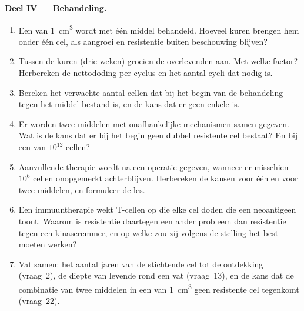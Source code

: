 \begin{problem}
\medskip
\noindent\textbf{Deel IV --- Behandeling.}
\begin{enumerate}[resume]
  \item Een  van \qty{1}{cm^3} wordt met één middel behandeld.
        Hoeveel kuren brengen hem onder één cel, als aangroei en
        resistentie buiten beschouwing blijven?
  \item Tussen de kuren (drie weken) groeien de overlevenden aan. Met
        welke factor? Herbereken de nettododing per cyclus en het
        aantal cycli dat nodig is.
  \item Bereken het verwachte aantal cellen dat bij het begin van de
        behandeling tegen het middel bestand is, en de kans dat er geen
        enkele is.
  \item Er worden twee middelen met onafhankelijke mechanismen samen
        gegeven. Wat is de kans dat er bij het begin geen dubbel
        resistente cel bestaat? En bij een  van $10^{12}$ cellen?
  \item Aanvullende therapie wordt na een operatie gegeven, wanneer er
        misschien $10^{6}$ cellen onopgemerkt achterblijven. Herbereken
        de kansen voor één en voor twee middelen, en formuleer de les.
  \item Een immuuntherapie wekt T-cellen op die elke cel doden die een
        neoantigeen toont. Waarom is resistentie daartegen een ander
        probleem dan resistentie tegen een kinaseremmer, en op welke
         zou zij volgens de stelling het best moeten werken?
  \item Vat samen: het aantal jaren van de stichtende cel tot de
        ontdekking (vraag~2), de diepte van levende  rond een vat
        (vraag~13), en de kans dat de combinatie van twee middelen in
        een  van \qty{1}{cm^3} geen resistente cel tegenkomt
        (vraag~22).
\end{enumerate}
\end{problem}
